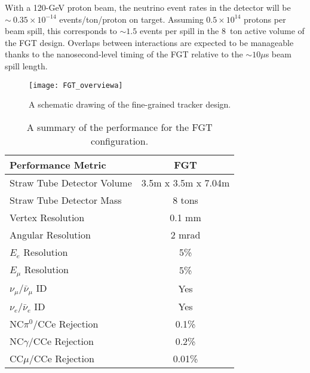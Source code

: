 \documentclass[aps,prl,preprint,groupedaddress]{revtex4}
\begin{document}
With a 120-GeV proton beam, the neutrino event rates in the detector
will be $\sim~0.35\times 10^{-14}$ events/ton/proton on target.
Assuming $0.5\times 10^{14}$ protons per beam spill, this corresponds
to $\sim 1.5$ events per spill in the 8~ton active volume of the FGT
design.  Overlaps between interactions are expected to be
manageable thanks to the nanosecond-level timing of the FGT relative to
the $\sim 10 \mu$s beam spill length.

\begin{figure}
\begin{center}
\texttt{[image: FGT\_overviewa]}
\caption{\label{STT_schematic} A schematic drawing of the fine-grained
tracker design.} 
\end{center}
\end{figure}

\begin{table}
\centering
  \caption{\label{tab:comparison} A summary of the performance for 
the FGT configuration.}
  \begin{tabular}{| l | c |}
    \hline
Performance Metric&FGT \\
    \hline
Straw Tube Detector Volume & 3.5m x 3.5m x 7.04m \\
Straw Tube Detector Mass&8 tons \\
Vertex Resolution&0.1 mm \\
Angular Resolution&2 mrad \\
$E_e$ Resolution&5\% \\
$E_\mu$ Resolution&5\% \\
$\nu_\mu/\bar \nu_\mu$ ID&Yes \\
$\nu_e/\bar \nu_e$ ID&Yes \\
NC$\pi^0$/CCe Rejection&0.1\% \\
NC$\gamma$/CCe Rejection&0.2\% \\
CC$\mu$/CCe Rejection&0.01\% \\
     \hline
  \end{tabular}
\end{table}
\end{document}
